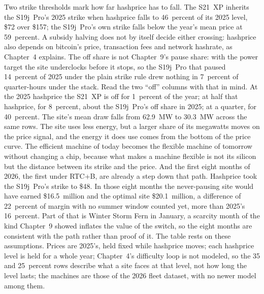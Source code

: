 Two strike thresholds mark how far hashprice has to fall. The S21~XP inherits the S19j~Pro's 2025 strike when hashprice falls to 46~percent of its 2025 level, \$72 over \$157; the S19j~Pro's own strike falls below the year's mean price at 59~percent. A subsidy halving does not by itself decide either crossing: hashprice also depends on bitcoin's price, transaction fees and network hashrate, as Chapter~4 explains. %
The off share is not Chapter~9's pause share: with the power target the site underclocks before it stops, so the S19j~Pro that paused 14~percent of 2025 under the plain strike rule drew nothing in 7~percent of quarter-hours under the stack. Read the two ``off'' columns with that in mind. At the 2025 hashprice the S21~XP is off for 1~percent of the year; at half that hashprice, for 8~percent, about the S19j~Pro's off share in 2025; at a quarter, for 40~percent. The site's mean draw falls from 62.9~MW to 30.3~MW across the same rows. The site uses less energy, but a larger share of its megawatts moves on the price signal, and the energy it does use comes from the bottom of the price curve. %
The efficient machine of today becomes the flexible machine of tomorrow without changing a chip, because what makes a machine flexible is not its silicon but the distance between its strike and the price. And the first eight months of 2026, the first under RTC+B, are already a step down that path. Hashprice took the S19j~Pro's strike to \$48. In those eight months the never-pausing site would have earned \$16.5~million and the optimal site \$20.1~million, a difference of 22~percent of margin with no summer window counted yet, more than 2025's 16~percent. Part of that is Winter Storm Fern in January, a scarcity month of the kind Chapter~9 showed inflates the value of the switch, so the eight months are consistent with the path rather than proof of it. %
The table rests on these assumptions. Prices are 2025's, held fixed while hashprice moves; each hashprice level is held for a whole year; Chapter~4's difficulty loop is not modeled, so the 35 and 25~percent rows describe what a site faces at that level, not how long the level lasts; the machines are those of the 2026 fleet dataset, with no newer model among them.

